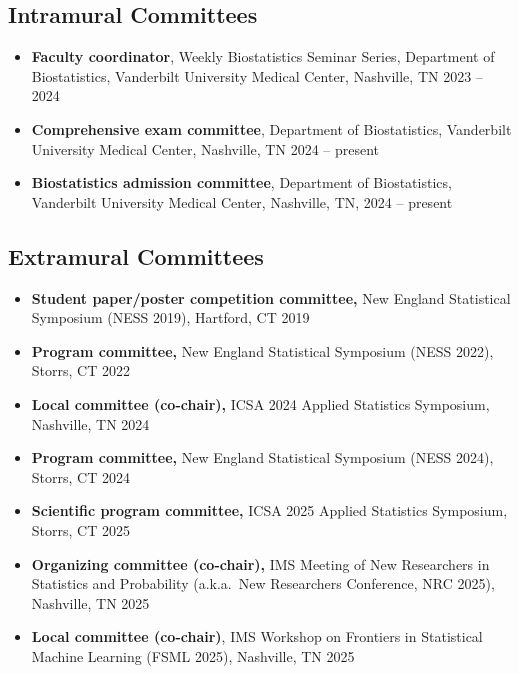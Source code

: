 \documentclass[12pt]{article}
\begin{document}
	\subsection*{Intramural Committees}
	\begin{itemize}
		\item {\bf Faculty coordinator}, Weekly Biostatistics 
		Seminar Series, Department of Biostatistics, Vanderbilt 
		University Medical Center, Nashville, TN \hfill 2023 -- 2024
		\item {\bf Comprehensive exam committee}, Department of 
		Biostatistics, Vanderbilt University Medical Center, 
		Nashville, TN \hfill 2024 -- present
		\item {\bf Biostatistics admission committee}, Department of 
		Biostatistics, Vanderbilt University Medical Center, 
		Nashville, TN, \hfill 2024 -- present
	\end{itemize}
	
	\subsection*{Extramural Committees}
	\begin{itemize}
		\item {\bf Student paper/poster competition committee,} New 
		England Statistical Symposium (NESS 2019), Hartford, CT 
		\hfill 2019
		\item {\bf Program committee,} New England Statistical 
		Symposium (NESS 2022), Storrs, CT \hfill 2022
		\item {\bf Local committee (co-chair),} ICSA 2024 Applied 
		Statistics Symposium, Nashville, TN \hfill \mbox{2024}
		\item {\bf Program committee,} New England Statistical 
		Symposium (NESS 2024), Storrs, CT \hfill 2024
		\item {\bf Scientific program committee,} ICSA 2025 
		Applied Statistics Symposium, Storrs, CT \hfill \mbox{2025}
		\item {\bf Organizing committee (co-chair),} IMS Meeting of 
		New Researchers in Statistics and Probability (a.k.a.\ New 
		Researchers Conference, NRC 2025), Nashville, TN \hfill 2025
		\item {\bf Local committee (co-chair)}, IMS Workshop on 
		Frontiers in Statistical Machine Learning (FSML 2025), 
		Nashville, TN 
		\hfill 2025 
	\end{itemize}
	
\end{document}
